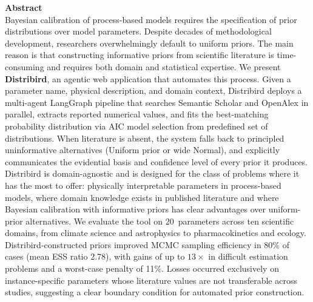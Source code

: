 \documentclass[11pt,a4paper]{article}
\begin{document}
\begin{mdframed}[style=calloutbox]
  \textbf{Abstract}\\[4pt]
  Bayesian calibration of process-based models requires the specification of prior distributions
  over model parameters. Despite decades of methodological development, researchers overwhelmingly
  default to uniform priors. The main reason is that constructing
  informative priors from scientific literature is time-consuming and requires both domain and
  statistical expertise. We present \textbf{Distribird}, an agentic web application that automates
  this process. Given a parameter name, physical description, and domain context, Distribird deploys
  a multi-agent LangGraph pipeline that searches Semantic Scholar and OpenAlex in parallel,
  extracts reported numerical values, and fits the best-matching probability distribution via AIC
  model selection from predefined set of distributions. When literature is absent, the system falls back to principled uninformative
  alternatives (Uniform prior or wide Normal), and explicitly communicates the evidential basis
  and confidence level of every prior it produces. Distribird is domain-agnostic and is designed for
  the class of problems where it has the most to offer: physically interpretable parameters in
  process-based models, where domain knowledge exists in published literature and where Bayesian
  calibration with informative priors has clear advantages over uniform-prior alternatives. We
  evaluate the tool on 20~parameters across ten scientific domains, from climate science and
  astrophysics to pharmacokinetics and ecology. Distribird-constructed priors improved MCMC
  sampling efficiency in 80\% of cases (mean ESS ratio 2.78), with gains of up to $13\times$
  in difficult estimation problems and a worst-case penalty of 11\%. Losses occurred exclusively
  on instance-specific parameters whose literature values are not transferable across studies,
  suggesting a clear boundary condition for automated prior construction.
\end{mdframed}

\listoftodos


\end{document}
